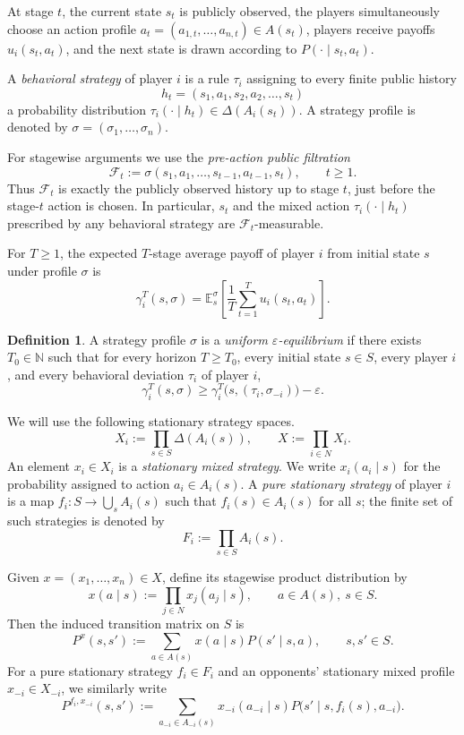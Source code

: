 \documentclass[11pt]{article}
\theoremstyle{definition}
\newtheorem{definition}[theorem]{Definition}
\newcommand{\E}{\mathbb{E}}
\newcommand{\1}{\mathbf{1}}
\begin{document}
At stage $t$, the current state $s_t$ is publicly observed, the players simultaneously choose an action profile $a_t=(a_{1,t},\dots,a_{n,t})\in A(s_t)$, players receive payoffs $u_i(s_t,a_t)$, and the next state is drawn according to $P(\cdot\mid s_t,a_t)$.

A \emph{behavioral strategy} of player $i$ is a rule $\tau_i$ assigning to every finite public history
\[
h_t=(s_1,a_1,s_2,a_2,\dots,s_t)
\]
a probability distribution $\tau_i(\cdot\mid h_t)\in\Delta(A_i(s_t))$. A strategy profile is denoted by $\sigma=(\sigma_1,\dots,\sigma_n)$.

For stagewise arguments we use the \emph{pre-action public filtration}
\[
\mathcal F_t:=\sigma(s_1,a_1,\dots,s_{t-1},a_{t-1},s_t),\qquad t\ge1.
\]
Thus $\mathcal F_t$ is exactly the publicly observed history up to stage $t$, just before the stage-$t$ action is chosen. In particular, $s_t$ and the mixed action $\tau_i(\cdot\mid h_t)$ prescribed by any behavioral strategy are $\mathcal F_t$-measurable.

For $T\ge1$, the expected $T$-stage average payoff of player $i$ from initial state $s$ under profile $\sigma$ is
\[
\gamma_i^T(s,\sigma)
=\E_s^{\sigma}\!\left[\frac1T\sum_{t=1}^{T}u_i(s_t,a_t)\right].
\]

\begin{definition}
A strategy profile $\sigma$ is a \emph{uniform $\varepsilon$-equilibrium} if there exists $T_0\in\mathbb N$ such that for every horizon $T\ge T_0$, every initial state $s\in S$, every player $i$, and every behavioral deviation $\tau_i$ of player $i$,
\[
\gamma_i^T(s,\sigma)\ge\gamma_i^T\bigl(s,(\tau_i,\sigma_{-i})\bigr)-\varepsilon.
\]
\end{definition}

We will use the following stationary strategy spaces.
\[
X_i:=\prod_{s\in S}\Delta(A_i(s)),\qquad X:=\prod_{i\in N}X_i.
\]
An element $x_i\in X_i$ is a \emph{stationary mixed strategy}. We write $x_i(a_i\mid s)$ for the probability assigned to action $a_i\in A_i(s)$. A \emph{pure stationary strategy} of player $i$ is a map $f_i:S\to\bigcup_{s}A_i(s)$ such that $f_i(s)\in A_i(s)$ for all $s$; the finite set of such strategies is denoted by
\[
F_i:=\prod_{s\in S}A_i(s).
\]

Given $x=(x_1,\dots,x_n)\in X$, define its stagewise product distribution by
\[
x(a\mid s):=\prod_{j\in N}x_j(a_j\mid s),\qquad a\in A(s),\ s\in S.
\]
Then the induced transition matrix on $S$ is
\[
P^x(s,s'):=\sum_{a\in A(s)}x(a\mid s)P(s'\mid s,a),\qquad s,s'\in S.
\]
For a pure stationary strategy $f_i\in F_i$ and an opponents' stationary mixed profile $x_{-i}\in X_{-i}$, we similarly write
\[
P^{f_i,x_{-i}}(s,s'):=\sum_{a_{-i}\in A_{-i}(s)}x_{-i}(a_{-i}\mid s)
P\bigl(s'\mid s,f_i(s),a_{-i}\bigr).
\]
\end{document}
